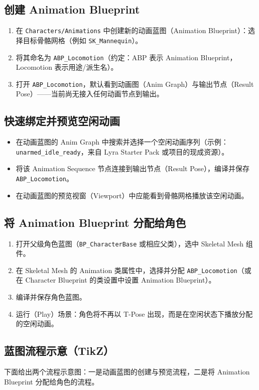 \documentclass[10pt,CJKmath]{zhbook-v1}
\newcommand{\il}[1]{\texttt{#1}}%
\begin{document}
\subsection{创建 Animation Blueprint}
\begin{enumerate}
  \item 在 \il{Characters/Animations} 中创建新的动画蓝图（Animation Blueprint）：选择目标骨骼网格（例如 \il{SK_Mannequin}）。
  \item 将其命名为 \il{ABP_Locomotion}（约定：ABP 表示 Animation Blueprint，Locomotion 表示用途/派生名）。
  \item 打开 \il{ABP_Locomotion}，默认看到动画图（Anim Graph）与输出节点（Result Pose）——当前尚无接入任何动画节点到输出。
\end{enumerate}

\subsection{快速绑定并预览空闲动画}
\begin{itemize}
  \item 在动画蓝图的 Anim Graph 中搜索并选择一个空闲动画序列（示例：\il{unarmed_idle_ready}，来自 Lyra Starter Pack 或项目的现成资源）。
  \item 将该 Animation Sequence 节点连接到输出节点（Result Pose），编译并保存 \il{ABP_Locomotion}。
  \item 在动画蓝图的预览视窗（Viewport）中应能看到骨骼网格播放该空闲动画。
\end{itemize}

\subsection{将 Animation Blueprint 分配给角色}
\begin{enumerate}
  \item 打开父级角色蓝图（\il{BP_CharacterBase} 或相应父类），选中 Skeletal Mesh 组件。
  \item 在 Skeletal Mesh 的 Animation 类属性中，选择并分配 \il{ABP_Locomotion}（或在 Character Blueprint 的类设置中设置 Animation Blueprint）。
  \item 编译并保存角色蓝图。
  \item 运行（Play）场景：角色将不再以 T-Pose 出现，而是在空闲状态下播放分配的空闲动画。
\end{enumerate}

\subsection{蓝图流程示意（TikZ）}
下面给出两个流程示意图：一是动画蓝图的创建与预览流程，二是将 Animation Blueprint 分配给角色的流程。
\end{document}

